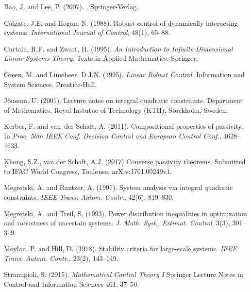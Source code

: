 \documentclass[11pt]{article}
\begin{document}
\begin{thebibliography}{99.}
%
Bao, J. and Lee, P. (2007).
.
\newblock Springer-Verlag.

Colgate, J.E. and Hogan, N. (1988).
\newblock Robust control of dynamically interacting systems.
\newblock \emph{International Journal of Control}, 48(1), 65--88.

Curtain, R.F. and Zwart, H. (1995).
\newblock \emph{An Introduction to Infinite-Dimensional Linear Systems Theory}.
\newblock Texts in Applied Mathematics, Springer.

Green, M. and Limebeer, D.J.N. (1995).
\newblock \emph{Linear Robust Control}.
\newblock Information and System Sciences. Prentice-Hall.

J{\" o}nsson, U. (2001).
\newblock Lecture notes on integral quadratic constraints.
\newblock Department of Mathematics, Royal Instutue of Technology (KTH),
  Stockholm, Sweden.

Kerber, F. and van~der Schaft, A. (2011).
\newblock Compositional properties of passivity.
\newblock In \emph{Proc. 50th IEEE Conf. Decision Control and European Control
  Conf.}, 4628--4633.
  
Khong, S.Z., van der Schaft, A.J.  (2017)
\newblock Converse passivity theorems.
\newblock Submitted to IFAC World Congress, Toulouse, arXiv:1701.00249v1.

Megretski, A. and Rantzer, A. (1997).
\newblock System analysis via integral quadratic constraints.
\newblock \emph{IEEE Trans. Autom. Contr.}, 42(6), 819--830.

Megretski, A. and Treil, S. (1993).
\newblock Power distribution inequalities in optimization and robustness of
  uncertain systems.
\newblock \emph{J. Math. Syst., Estimat. Control}, 3(3), 301--319.

Moylan, P. and Hill, D. (1978).
\newblock Stability criteria for large-scale systems.
\newblock \emph{IEEE Trans. Autom. Contr.}, 23(2), 143--149.

Stramigioli, S. (2015).
\newblock \emph{Mathematical Control Theory I}
Springer Lecture Notes in Control and Information Sciences 461, 37--50.


\end{thebibliography}
\end{document}
